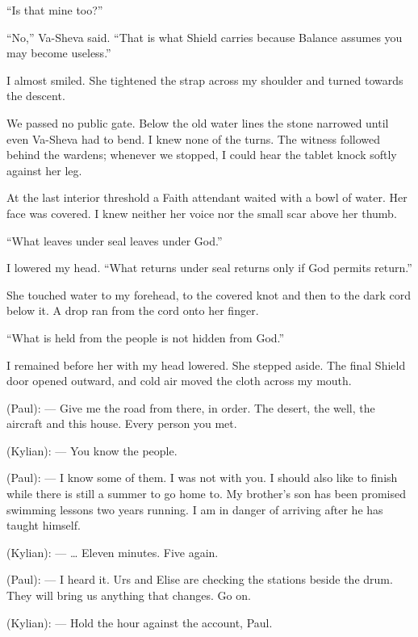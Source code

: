 ``Is that mine too?''\par

``No,'' Va-Sheva said. ``That is what Shield carries because Balance assumes you may become useless.''\par

I almost smiled. She tightened the strap across my shoulder and turned towards the descent.\par

We passed no public gate. Below the old water lines the stone narrowed until even Va-Sheva had to bend. I knew none of the turns. The witness followed behind the wardens; whenever we stopped, I could hear the tablet knock softly against her leg.\par

At the last interior threshold a Faith attendant waited with a bowl of water. Her face was covered. I knew neither her voice nor the small scar above her thumb.\par

``What leaves under seal leaves under God.''\par

I lowered my head. ``What returns under seal returns only if God permits return.''\par

She touched water to my forehead, to the covered knot and then to the dark cord below it. A drop ran from the cord onto her finger.\par

``What is held from the people is not hidden from God.''\par

I remained before her with my head lowered. She stepped aside. The final Shield door opened outward, and cold air moved the cloth across my mouth.\par

\ornament

\begin{room}

(Paul): --- Give me the road from there, in order. The desert, the well, the aircraft and this house. Every person you met.

(Kylian): --- You know the people.

(Paul): --- I know some of them. I was not with you. I should also like to finish while there is still a summer to go home to. My brother's son has been promised swimming lessons two years running. I am in danger of arriving after he has taught himself.

(Kylian): --- \ldots{} Eleven minutes. Five again.

(Paul): --- I heard it. Urs and Elise are checking the stations beside the drum. They will bring us anything that changes. Go on.

(Kylian): --- Hold the hour against the account, Paul.

\end{room}

